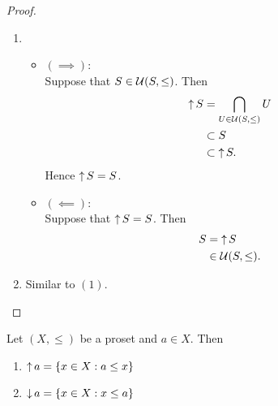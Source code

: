 \documentclass{book}
\begin{document}
	\begin{proof}\
		\begin{enumerate}
			\item
			\begin{itemize}
				\item $(\implies)$: \\
				Suppose that $S \in \mathcal{U}(S, \leq)$. Then 
				\begin{align*}
					\operatorname{\uparrow} S
					& = \bigcap\limits_{U \in \mathcal{U}(S, \leq)} U \\
					& \subset S \\
					& \subset \operatorname{\uparrow} S.
				\end{align*}
				Hence $\operatorname{\uparrow} S = S$.
				\item $(\impliedby)$: \\
				Suppose that $\operatorname{\uparrow} S = S$. Then 
				\begin{align*}
					S
					& = \operatorname{\uparrow} S \\
					& \in \mathcal{U}(S, \leq).
				\end{align*}
			\end{itemize}
			\item Similar to $(1)$.
		\end{enumerate}
	\end{proof}
	
	\begin{ex} 
		Let $(X, \leq)$ be a proset and $a \in X$. Then 
		\begin{enumerate}
			\item $\operatorname{\uparrow} a = \{x \in X: a \leq x\}$
			\item $\operatorname{\downarrow} a = \{x \in X: x \leq a\}$
		\end{enumerate}
	\end{ex}
	
\end{document}
